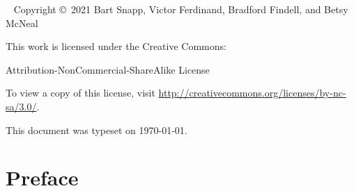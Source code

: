\newpage

\begin{fullwidth}
~\vfill
\thispagestyle{empty}
\setlength{\parindent}{0pt}
\setlength{\parskip}{\baselineskip}
Copyright \copyright~2021 Bart Snapp, Victor Ferdinand, Bradford Findell, and Betsy McNeal

\vspace{.5cm}

\noindent
This work is licensed under the Creative Commons:
\begin{center}
Attribution-NonCommercial-ShareAlike License 
\end{center}
To view a copy of this license, visit \url{http://creativecommons.org/licenses/by-nc-sa/3.0/}.

\vspace{.5cm}
\noindent This document was typeset on \today.
\end{fullwidth}


\chapter*{Preface}


